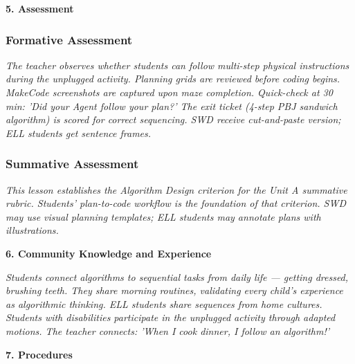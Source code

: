 \documentclass[11pt,letterpaper]{article}
\begin{document}
\newpage
\textbf{5. Assessment}

\subsubsection{Formative Assessment}

\textit{The teacher observes whether students can follow multi-step physical instructions during the unplugged activity. Planning grids are reviewed before coding begins. MakeCode screenshots are captured upon maze completion. Quick-check at 30 min: 'Did your Agent follow your plan?' The exit ticket (4-step PBJ sandwich algorithm) is scored for correct sequencing. SWD receive cut-and-paste version; ELL students get sentence frames.}

\subsubsection{Summative Assessment}

\textit{This lesson establishes the Algorithm Design criterion for the Unit A summative rubric. Students' plan-to-code workflow is the foundation of that criterion. SWD may use visual planning templates; ELL students may annotate plans with illustrations.}

\textbf{6. Community Knowledge and Experience}

\textit{Students connect algorithms to sequential tasks from daily life --- getting dressed, brushing teeth. They share morning routines, validating every child's experience as algorithmic thinking. ELL students share sequences from home cultures. Students with disabilities participate in the unplugged activity through adapted motions. The teacher connects: 'When I cook dinner, I follow an algorithm!'}

\textbf{7. Procedures}
\end{document}
